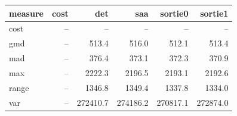 \begin{tabular}{lrrrrr}
\toprule
measure & cost & det & saa & sortie0 & sortie1 \\
\midrule
cost & -- & -- & -- & -- & -- \\
gmd & -- & 513.4 & 516.0 & 512.1 & 513.4 \\
mad & -- & 376.4 & 373.1 & 372.3 & 370.9 \\
max & -- & 2222.3 & 2196.5 & 2193.1 & 2192.6 \\
range & -- & 1346.8 & 1349.4 & 1337.8 & 1334.0 \\
var & -- & 272410.7 & 274186.2 & 270817.1 & 272874.0 \\
\bottomrule
\end{tabular}
